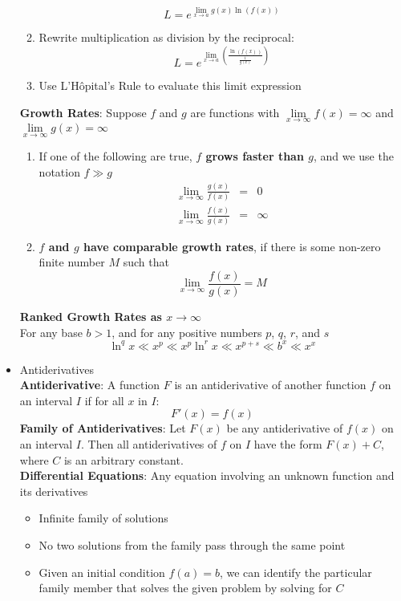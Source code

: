 \documentclass{article}
\begin{document}
\begin{itemize}
\begin{enumerate}
        $$L = e^{\lim\limits_{x \to a}{g(x)\ln{\left(f(x)\right)}}}$$
        \item Rewrite multiplication as division by the reciprocal:
        $$L = e^{\lim\limits_{x \to a}{\left(\frac{\ln{\left(f(x)\right)}}{\frac{1}{g(x)}}\right)}}$$
        \item Use L'Hôpital's Rule to evaluate this limit expression
    \end{enumerate}
    \textbf{Growth Rates}: Suppose $f$ and $g$ are functions with $\lim\limits_{x \to \infty}{f(x)} = \infty$ and $\lim\limits_{x \to \infty}{g(x)} = \infty$ \\
    \begin{enumerate}
        \item If one of the following are true, \textbf{$f$ grows faster than $g$}, and we use the notation $f \gg g$
        \begin{eqnarray}
            \lim_{x \to \infty}{\frac{g(x)}{f(x)}} &=& 0 \\
            \lim_{x \to \infty}{\frac{f(x)}{g(x)}} &=& \infty
        \end{eqnarray}
        \item \textbf{$f$ and $g$ have comparable growth rates}, if there is some non-zero finite number $M$ such that
        $$\lim_{x \to \infty}{\frac{f(x)}{g(x)}} = M$$
    \end{enumerate}
    \textbf{Ranked Growth Rates as $x \to \infty$} \\
    For any base $b > 1$, and for any positive numbers $p$, $q$, $r$, and $s$
    $$\ln^q{x} \ll x^p \ll x^p \ln^r{x} \ll x^{p + s} \ll b^x \ll x^x$$
    \item Antiderivatives \\
    \textbf{Antiderivative}: A function $F$ is an antiderivative of another function $f$ on an interval $I$ if for all $x$ in $I$:
    $$F'(x) = f(x)$$
    \textbf{Family of Antiderivatives}: Let $F(x)$ be any antiderivative of $f(x)$ on an interval $I$. Then all antiderivatives of $f$ on $I$ have the form $F(x) + C$, where $C$ is an arbitrary constant. \\
    \textbf{Differential Equations}: Any equation involving an unknown function and its derivatives
    \begin{itemize}
        \item Infinite family of solutions
        \item No two solutions from the family pass through the same point
        \item Given an initial condition $f(a) = b$, we can identify the particular family member that solves the given problem by solving for $C$

\end{itemize}
\end{itemize}
\end{document}
